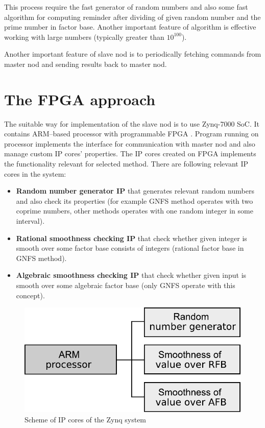 \documentclass[conference]{IEEEtran}
\begin{document}
This process require the fast generator of random numbers and also some fast algorithm for computing reminder after dividing of given random number and the prime number in factor base. Another important feature of algorithm is effective working with large numbers (typically greater than $10^{100}$). 

Another important feature of slave nod is to periodically fetching commands from master nod and sending results back to master nod.




\section{The FPGA approach}
The suitable way for implementation of the slave nod is to use Zynq-7000 SoC. It contains ARM--based processor with programmable FPGA \cite{zynq}. Program running on processor implements the interface for communication with master nod and also manage custom IP cores' properties. The IP cores created on FPGA implements the functionality relevant for selected method. There are following relevant IP cores in the system:
\begin{itemize}
\item \textbf{Random number generator IP} that generates relevant random numbers and also check its properties (for example GNFS method operates with two coprime numbers, other methods operates with one random integer in some interval). 
\item \textbf{Rational smoothness checking IP} that check whether given integer is smooth over some factor base consists of integers (rational factor base in GNFS method).
\item \textbf{Algebraic smoothness checking IP} that check whether given input is smooth over some algebraic factor base (only GNFS operate with this concept).
\end{itemize}

\begin{figure}[htbp]
\centerline{\includegraphics[scale=0.5]{processor.pdf}}
\caption{\label{fig:PROC}Scheme of IP cores of the Zynq system}
\end{figure}
\end{document}
